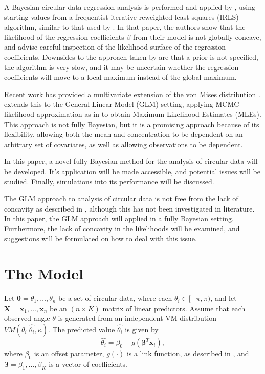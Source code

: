 \documentclass[12pt,a4paper]{article}\usepackage[]{graphicx}\usepackage[]{color}
\begin{document}
A Bayesian circular data regression analysis is performed and applied by \citet{gill2010}, using starting values from a frequentist iterative reweighted least squares (IRLS) algorithm, similar to that used by \citet{fisher1992regression}. In that paper, the authors show that the likelihood of the regression coefficients $\beta$ from their model is not globally concave, and advise careful inspection of the likelihood surface of the regression coefficients. Downsides to the approach taken by \citet{gill2010} are that a prior is not specified, the algorithm is very slow, and it may be uncertain whether the regression coefficients will move to a local maximum instead of the global maximum.

Recent work has provided a multivariate extension of the von Mises distribution \citep{mardia2008multivariate,mardia2014some}. \citet{lagona2014regression} extends this to the General Linear Model (GLM) setting, applying MCMC likelihood approximation as in \citet{geyer1992constrained} to obtain Maximum Likelihood Estimates (MLEs). This approach is not fully Bayesian, but it is a promising approach because of its flexibility, allowing both the mean and concentration to be dependent on an arbitrary set of covariates, as well as allowing observations to be dependent.

In this paper, a novel fully Bayesian method for the analysis of circular data will be developed. It's application will be made accessible, and potential issues will be studied. Finally, simulations into its performance will be discussed.

The GLM approach to analysis of circular data is not free from the lack of concavity as described in \citet{gill2010}, although this has not been investigated in literature. In this paper, the GLM approach will applied in a fully Bayesian setting. Furthermore, the lack of concavity in the likelihoods will be examined, and suggestions will be formulated on how to deal with this issue.

\section{The Model}

Let $\boldsymbol\theta = \theta_1, \dots, \theta_n$ be a set of circular data, where each $\theta_i \in [-\pi, \pi)$, and let $\boldsymbol{X} = \boldsymbol{x}_1, \dots, \boldsymbol{x}_n$ be an $(n \times K)$ matrix of linear predictors. Assume that each observed angle $\theta$ is generated from an independent VM distribution $ VM(\theta_i \vert \hat{\theta_i}, \kappa)$. The predicted value $\hat{\theta_i}$ is given by
\begin{equation}
\hat{\theta_i} = \beta_0 + g(\boldsymbol\beta^T \boldsymbol{x}_i),
\end{equation}
where $\beta_0$ is an offset parameter, $g(\cdot)$ is a link function, as described in \citet{fisher1992regression}, and $\boldsymbol{\beta} = \beta_1, \dots, \beta_K$ is a vector of coefficients.
\end{document}
